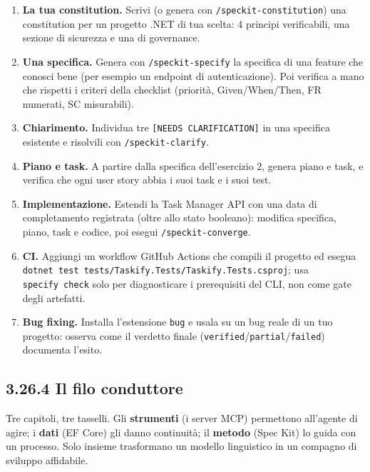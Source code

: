 \documentclass[
  italian,
  10pt,
]{book}
\providecommand{\tightlist}{%
  \setlength{\itemsep}{0pt}\setlength{\parskip}{0pt}}
\begin{document}
\begin{enumerate}
\def\labelenumi{\arabic{enumi}.}
\tightlist
\item
  \textbf{La tua constitution.} Scrivi (o genera con
  \texttt{/speckit-constitution}) una constitution per un progetto .NET
  di tua scelta: 4 principi verificabili, una sezione di sicurezza e una
  di governance.
\item
  \textbf{Una specifica.} Genera con \texttt{/speckit-specify} la
  specifica di una feature che conosci bene (per esempio un endpoint di
  autenticazione). Poi verifica a mano che rispetti i criteri della
  checklist (priorità, Given/When/Then, FR numerati, SC misurabili).
\item
  \textbf{Chiarimento.} Individua tre
  \texttt{{[}NEEDS\ CLARIFICATION{]}} in una specifica esistente e
  risolvili con \texttt{/speckit-clarify}.
\item
  \textbf{Piano e task.} A partire dalla specifica dell'esercizio 2,
  genera piano e task, e verifica che ogni user story abbia i suoi task
  e i suoi test.
\item
  \textbf{Implementazione.} Estendi la Task Manager API con una data di
  completamento registrata (oltre allo stato booleano): modifica
  specifica, piano, task e codice, poi esegui
  \texttt{/speckit-converge}.
\item
  \textbf{CI.} Aggiungi un workflow GitHub Actions che compili il
  progetto ed esegua
  \texttt{dotnet\ test\ tests/Taskify.Tests/Taskify.Tests.csproj}; usa
  \texttt{specify\ check} solo per diagnosticare i prerequisiti del CLI,
  non come gate degli artefatti.
\item
  \textbf{Bug fixing.} Installa l'estensione \texttt{bug} e usala su un
  bug reale di un tuo progetto: osserva come il verdetto finale
  (\texttt{verified}/\texttt{partial}/\texttt{failed}) documenta
  l'esito.
\end{enumerate}

\subsection{3.26.4 Il filo conduttore}\label{il-filo-conduttore}

Tre capitoli, tre tasselli. Gli \textbf{strumenti} (i server MCP)
permettono all'agente di agire; i \textbf{dati} (EF Core) gli danno
continuità; il \textbf{metodo} (Spec Kit) lo guida con un processo. Solo
insieme trasformano un modello linguistico in un compagno di sviluppo
affidabile.

\backmatter
\end{document}
